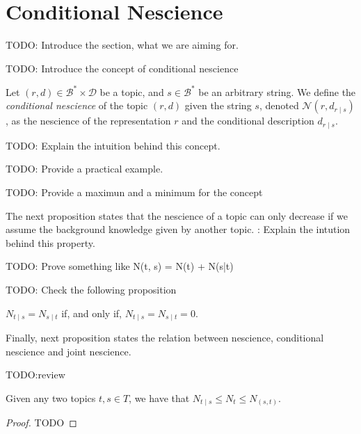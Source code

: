%
%

\section{Conditional Nescience}
\label{sec:conditional_nescience}

{\color{red} TODO: Introduce the section, what we are aiming for.}

{\color{red} TODO: Introduce the concept of conditional nescience}

\begin{definition}
Let $(r, d) \in \mathcal{B}^\ast \times \mathcal{D}$ be a topic, and $s \in \mathcal{B}^\ast$ be an arbitrary string. We define the \emph{conditional nescience} of the topic $(r, d)$ given the string $s$, denoted $\mathcal{N} (r, d_{r \mid s})$, as the nescience of the representation $r$ and the conditional description $d_{r \mid s}$.
\end{definition}

{\color{red} TODO: Explain the intuition behind this concept.}

{\color{red} TODO: Provide a practical example.}

{\color{red} TODO: Provide a maximun and a minimum for the concept}

The next proposition states that the nescience of a topic can only decrease if we assume the background knowledge given by another topic. {\color{red}: Explain the intution behind this property.}

{\color{red} TODO: Prove something like N(t, s) = N(t) + N(s|t)}

{\color{red} TODO: Check the following proposition}

\begin{proposition}
$N_{t \mid s} = N_{s \mid t}$ if, and only if, $N_{t \mid s} = N_{s \mid t} = 0$.
\end{proposition}

Finally, next proposition states the relation between nescience, conditional nescience and joint nescience.

{\color{red} TODO:review}

\begin{proposition}
Given any two topics $t, s \in T$, we have that $N_{t \mid s} \leq N_{t} \leq N_{(s, t)}$.
\end{proposition}
\begin{proof}
{\color{red} TODO}
\end{proof}

